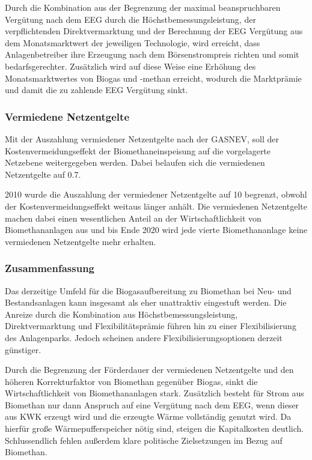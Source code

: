 Durch die Kombination aus der Begrenzung der maximal beanspruchbaren Vergütung nach dem \gls{EEG} durch die Höchstbemessungsleistung, der verpflichtenden Direktvermarktung und der Berechnung der \gls{EEG} Vergütung aus dem Monatsmarktwert der jeweiligen Technologie, wird erreicht, dass Anlagenbetreiber ihre Erzeugung nach dem Börsenstrompreis richten und somit bedarfsgerechter. Zusätzlich wird auf diese Weise eine Erhöhung des Monatsmarktwertes von Biogas und -methan erreicht, wodurch die Marktprämie und damit die zu zahlende EEG Vergütung sinkt.


\subsubsection{Vermiedene Netzentgelte}\label{chap:law_vN}

Mit der Auszahlung vermiedener Netzentgelte nach der \gls{GASNEV}, soll der Kostenvermeidungseffekt der Biomethaneinspeisung auf die vorgelagerte Netzebene weitergegeben werden. Dabei belaufen sich die vermiedenen Netzentgelte auf \SI{0.7}{\ctkwh}.\smallskip

\SI{2010}{\relax} wurde die Auszahlung der vermiedener Netzentgelte auf \SI{10}{\Jahre} begrenzt, obwohl der Kostenvermeidungseffekt weitaus länger anhält. Die vermiedenen Netzentgelte machen dabei einen wesentlichen Anteil an der Wirtschaftlichkeit von Biomethananlagen aus und bis Ende \SI{2020}{\relax} wird jede vierte Biomethananlage keine vermiedenen Netzentgelte mehr erhalten. \parencite{dena2018}


\subsubsection{Zusammenfassung}

Das derzeitige Umfeld für die Biogasaufbereitung zu Biomethan bei Neu- und Bestandsanlagen kann insgesamt als eher unattraktiv eingestuft werden. Die Anreize durch die Kombination aus Höchstbemessungsleistung, Direktvermarktung und Flexibilitätsprämie führen hin zu einer Flexibilisierung des Anlagenparks. Jedoch scheinen andere Flexibilisierungsoptionen derzeit günstiger.\smallskip

Durch die Begrenzung der Förderdauer der vermiedenen Netzentgelte und den höheren Korrekturfaktor von Biomethan gegenüber Biogas, sinkt die Wirtschaftlichkeit von Biomethananlagen stark. Zusätzlich besteht für Strom aus Biomethan nur dann Anspruch auf eine Vergütung nach dem \gls{EEG}, wenn dieser aus \gls{KWK} erzeugt wird und die erzeugte Wärme vollständig genutzt wird. Da hierfür große Wärmepufferspeicher nötig sind, steigen die Kapitalkosten deutlich. Schlussendlich fehlen außerdem klare politische Zielsetzungen im Bezug auf Biomethan. 

